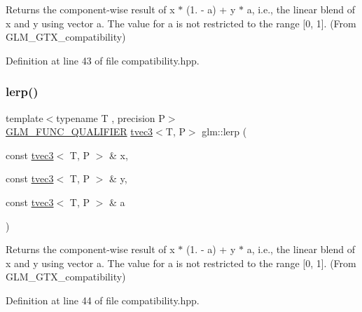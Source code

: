 Returns the component-\/wise result of x $\ast$ (1. -\/ a) + y $\ast$ a, i.\+e., the linear blend of x and y using vector a. The value for a is not restricted to the range \mbox{[}0, 1\mbox{]}. (From G\+L\+M\+\_\+\+G\+T\+X\+\_\+compatibility) 



Definition at line 43 of file compatibility.\+hpp.

\mbox{\label{group__gtx__compatibility_ga90a1d1364a8d078846857178bdcc9af1}} 
\subsubsection{\texorpdfstring{lerp()}{lerp()}\hspace{0.1cm}{\footnotesize\ttfamily [6/7]}}
{\footnotesize\ttfamily template$<$typename T , precision P$>$ \\
\mbox{\hyperlink{setup_8hpp_a33fdea6f91c5f834105f7415e2a64407}{G\+L\+M\+\_\+\+F\+U\+N\+C\+\_\+\+Q\+U\+A\+L\+I\+F\+I\+ER}} \mbox{\hyperlink{structglm_1_1tvec3}{tvec3}}$<$T, P$>$ glm\+::lerp (\begin{DoxyParamCaption}\item[{const \mbox{\hyperlink{structglm_1_1tvec3}{tvec3}}$<$ T, P $>$ \&}]{x,  }\item[{const \mbox{\hyperlink{structglm_1_1tvec3}{tvec3}}$<$ T, P $>$ \&}]{y,  }\item[{const \mbox{\hyperlink{structglm_1_1tvec3}{tvec3}}$<$ T, P $>$ \&}]{a }\end{DoxyParamCaption})}



Returns the component-\/wise result of x $\ast$ (1. -\/ a) + y $\ast$ a, i.\+e., the linear blend of x and y using vector a. The value for a is not restricted to the range \mbox{[}0, 1\mbox{]}. (From G\+L\+M\+\_\+\+G\+T\+X\+\_\+compatibility) 



Definition at line 44 of file compatibility.\+hpp.

\mbox{\label{group__gtx__compatibility_gae4b0244b0d882657bed0a99dfa33f379}} 
